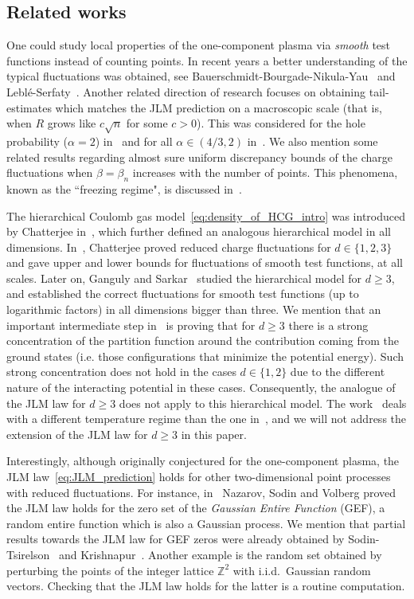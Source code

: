 \documentclass[11pt]{amsart}
\theoremstyle{definition}
\theoremstyle{remark}
\numberwithin{equation}{section}
\newcommand{\bZ}{\mathbb Z}
\begin{document}
	\subsection{Related works}
	One could study local properties of the one-component plasma via \emph{smooth} test functions instead of counting points. In recent years a better understanding of the typical fluctuations was obtained, see Bauerschmidt-Bourgade-Nikula-Yau~\cite{BauerschmidtBourgadeNikulaYau,BauerschmidtBourgadeNikulaYauQuasiFree} and Lebl\'e-Serfaty~\cite{LebleSerfatyGAFA}. Another related direction of research focuses on obtaining tail-estimates which matches the JLM prediction on a macroscopic scale (that is, when $R$ grows like $c\sqrt{n}$ for some $c>0$). This was considered for the hole probability ($\alpha=2$) in~\cite{Adhikari,Charlier} and for all $\alpha \in (4/3,2)$ in~\cite{GhoshNishry}. We also mention some related results regarding almost sure uniform discrepancy bounds of the charge fluctuations when $\beta=\beta_n$ increases with the number of points. This phenomena, known as the  ``freezing regime", is discussed in~\cite{Ameur-Romero,Marceca-Romero}.
	
	
	The hierarchical Coulomb gas model~\eqref{eq:density_of_HCG_intro} was introduced by Chatterjee in~\cite{chatterjee}, which further defined an analogous hierarchical model in all dimensions. In~\cite{chatterjee}, Chatterjee proved reduced charge fluctuations for $d\in\{1,2,3\}$ and gave upper and lower bounds for fluctuations of smooth test functions, at all scales. Later on, Ganguly and Sarkar~\cite{GangulySarkar} studied the hierarchical model for $d\ge 3$, and established the correct fluctuations for smooth test functions (up to logarithmic factors) in all dimensions bigger than three. We mention that an important intermediate step in~\cite[Eq. 3.11]{GangulySarkar} is proving that for $d\ge3$ there is a strong concentration of the partition function around the contribution coming from the ground states (i.e. those configurations that minimize the potential energy). Such strong concentration does not hold in the cases $d\in\{1,2\}$ due to the different nature of the interacting potential in these cases. Consequently, the analogue of the JLM law for $d\ge 3$ does not apply to this hierarchical model. The work~\cite{JLM} deals with a different temperature regime than the one in~\cite{chatterjee,GangulySarkar}, and we will not address the extension of the JLM law for $d\ge 3$ in this paper. 
		
	Interestingly, although originally conjectured for the one-component plasma, the JLM law~\eqref{eq:JLM_prediction} holds for other two-dimensional point processes with reduced fluctuations. For instance, in~\cite{Nazarov-Sodin-Volberg} Nazarov, Sodin and Volberg proved the JLM law holds for the zero set of the \emph{Gaussian Entire Function} (GEF), a random entire function which is also a Gaussian process. We mention that partial results towards the JLM law for GEF zeros were already obtained by Sodin-Tsirelson~\cite{SodinTsirelson3} and Krishnapur~\cite{Krishnapur}. Another example is the random set obtained by perturbing the points of the integer lattice $\bZ^2$ with i.i.d.\ Gaussian random vectors. Checking that the JLM law holds for the latter is a routine computation. 
	
\end{document}
